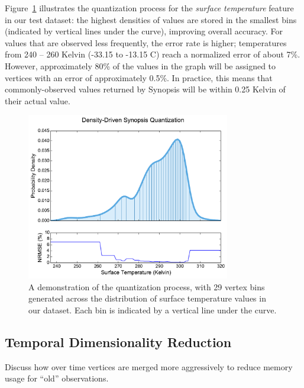 Figure~\ref{fig:quantization} illustrates the quantization process for the \emph{surface temperature} feature in our test dataset: the highest densities of values are stored in the smallest bins (indicated by vertical lines under the curve), improving overall accuracy. For values that are observed less frequently, the error rate is higher; temperatures from 240 -- 260 Kelvin (-33.15 to -13.15 \degree C) reach a normalized error of about 7\%. However, approximately 80\% of the values in the graph will be assigned to vertices with an error of approximately 0.5\%. In practice, this means that commonly-observed values returned by Synopsis will be within 0.25 Kelvin of their actual value.

\begin{figure}
    \centerline{\includegraphics[width=3.5in]{figures/quantization.pdf}}
    \caption{A demonstration of the quantization process, with 29 vertex bins generated across the distribution of surface temperature values in our dataset. Each bin is indicated by a vertical line under the curve.}
    \label{fig:quantization}
\end{figure}

\subsection{Temporal Dimensionality Reduction}
Discuss how over time vertices are merged more aggressively to reduce memory usage for ``old'' observations.
